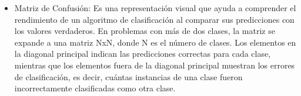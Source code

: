 \begin{itemize}
\item Matriz de Confusión: Es una representación visual que ayuda a comprender el rendimiento de un algoritmo de clasificación al comparar sus predicciones con los valores verdaderos. En problemas con más de dos clases, la matriz se expande a una matriz NxN, donde N es el número de clases. Los elementos en la diagonal principal indican las predicciones correctas para cada clase, mientras que los elementos fuera de la diagonal principal muestran los errores de clasificación, es decir, cuántas instancias de una clase fueron incorrectamente clasificadas como otra clase.

\end{itemize}
